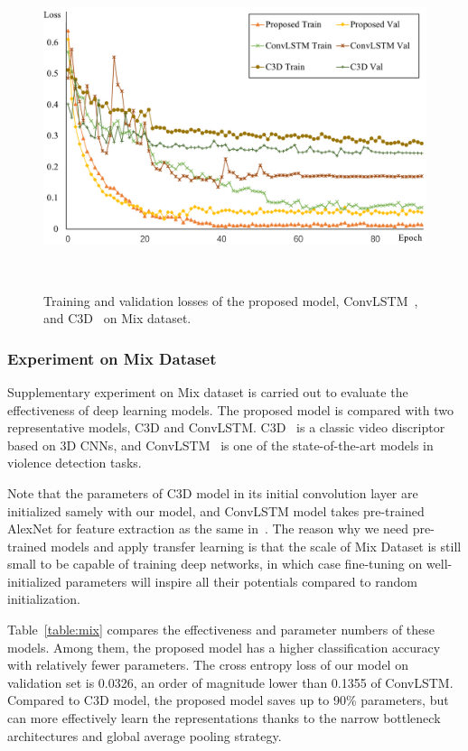 \documentclass[10pt,twocolumn,letterpaper]{article}
\begin{document}
\begin{figure}[t]
\begin{center}
\includegraphics[scale=0.40]{fig/fig3.png}
\end{center}
\caption{Training and validation losses of the proposed model, ConvLSTM~\cite{convlstm_sudh}, and C3D~\cite{3dcnn_1} on Mix dataset.}
~\label{fig:mix}
\end{figure}


\subsubsection{Experiment on Mix Dataset}

Supplementary experiment on Mix dataset is carried out to evaluate the effectiveness of deep learning models.
The proposed model is compared with two representative models, C3D and ConvLSTM.
C3D~\cite{3dcnn_1} is a classic video discriptor based on 3D CNNs, and ConvLSTM~\cite{convlstm_sudh} is one of the state-of-the-art models in violence detection tasks.
 
Note that the parameters of C3D model in its initial convolution layer are initialized samely with our model, and ConvLSTM model takes pre-trained AlexNet for feature extraction as the same in~\cite{convlstm_sudh}.
The reason why we need pre-trained models and apply transfer learning is that the scale of Mix Dataset is still small to be capable of training deep networks, in which case fine-tuning on well-initialized parameters will inspire all their potentials compared to random initialization.

Table~\ref{table:mix} compares the effectiveness and parameter numbers of these models.
Among them, the proposed model has a higher classification accuracy with relatively fewer parameters.
The cross entropy loss of our model on validation set is 0.0326, an order of magnitude lower than 0.1355 of ConvLSTM.
Compared to C3D model, the proposed model saves up to 90\% parameters, but can more effectively learn the representations thanks to the narrow bottleneck architectures and global average pooling strategy.
\end{document}
